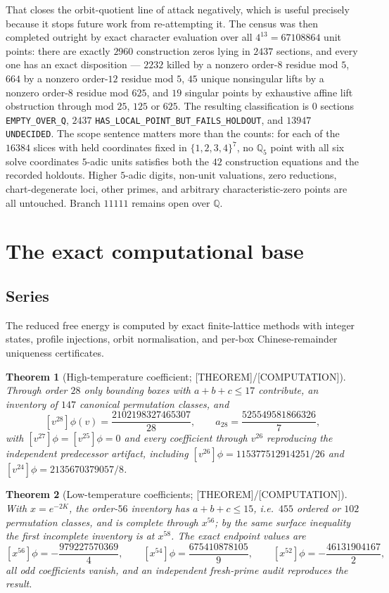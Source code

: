 \documentclass[11pt]{article}
\newtheorem{theorem}{Theorem}[section]
\theoremstyle{definition}
\newcommand{\Qb}{\mathbb{Q}}
\begin{document}
That closes the orbit-quotient line of attack negatively, which is useful precisely because it stops
future work from re-attempting it. The census was then completed outright by exact character
evaluation over all $4^{13}=67108864$ unit points: there are exactly $2960$ construction zeros lying
in $2437$ sections, and every one has an exact disposition --- $2232$ killed by a nonzero order-$8$
residue mod $5$, $664$ by a nonzero order-$12$ residue mod $5$, $45$ unique nonsingular lifts by a
nonzero order-$8$ residue mod $625$, and $19$ singular points by exhaustive affine lift obstruction
through mod $25$, $125$ or $625$. The resulting classification is
$0$ sections \texttt{EMPTY\_OVER\_Q}, $2437$ \texttt{HAS\_LOCAL\_POINT\_BUT\_FAILS\_HOLDOUT}, and
$13947$ \texttt{UNDECIDED}. The scope sentence matters more than the counts: for each of the $16384$
slices with held coordinates fixed in $\{1,2,3,4\}^7$, no $\Qb_5$ point with all six solve coordinates
$5$-adic units satisfies both the $42$ construction equations and the recorded holdouts. Higher
$5$-adic digits, non-unit valuations, zero reductions, chart-degenerate loci, other primes, and
arbitrary characteristic-zero points are all untouched. Branch $11111$ remains open over $\Qb$.

\section{The exact computational base}\label{sec:series}

\subsection{Series}
The reduced free energy is computed by exact finite-lattice methods with integer states, profile
injections, orbit normalisation, and per-box Chinese-remainder uniqueness certificates.

\begin{theorem}[High-temperature coefficient; {[THEOREM]}/{[COMPUTATION]}]
Through order $28$ only bounding boxes with $a+b+c\le17$ contribute, an inventory of $147$ canonical
permutation classes, and
\[
[v^{28}]\phi(v)=\frac{2102198327465307}{28},\qquad
a_{28}=\frac{525549581866326}{7},
\]
with $[v^{27}]\phi=[v^{25}]\phi=0$ and every coefficient through $v^{26}$ reproducing the independent
predecessor artifact, including $[v^{26}]\phi=115377512914251/26$ and
$[v^{24}]\phi=2135670379057/8$.
\end{theorem}

\begin{theorem}[Low-temperature coefficients; {[THEOREM]}/{[COMPUTATION]}]
With $x=e^{-2K}$, the order-$56$ inventory has $a+b+c\le15$, i.e.\ $455$ ordered or $102$ permutation
classes, and is complete through $x^{56}$; by the same surface inequality the first incomplete
inventory is at $x^{58}$. The exact endpoint values are
\[
[x^{56}]\phi=-\frac{979227570369}{4},\qquad
[x^{54}]\phi=\frac{675410878105}{9},\qquad
[x^{52}]\phi=-\frac{46131904167}{2},
\]
all odd coefficients vanish, and an independent fresh-prime audit reproduces the result.
\end{theorem}
\end{document}
